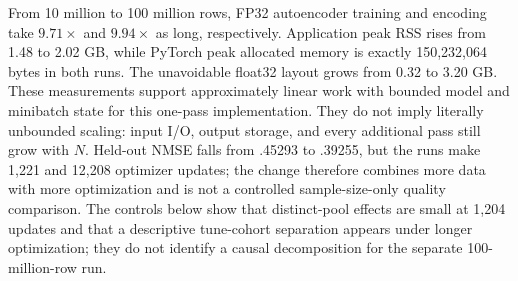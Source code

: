 \documentclass[10pt]{article}
\begin{document}
\begin{table}[H]
\centering
\scriptsize
\setlength{\tabcolsep}{3.0pt}
\caption{Single-run Deep1B GPU scaling measurements; memory values are decimal GB.
``Core'' means autoencoder training or graph \texttt{fit\_transform}.  Autoencoder total
and graph worker time have the broader, method-specific scopes defined in the protocol.
PyTorch allocator memory and incremental NVML process memory are different scopes and
should not be treated as a common total-memory measurement.  The failed DiRe allocation
never became resident.}
\label{tab:deep-scaling}
\end{table}

From 10 million to 100 million rows, FP32 autoencoder training and encoding take
$9.71\times$ and $9.94\times$ as long, respectively.  Application peak RSS rises from
1.48 to 2.02 GB, while PyTorch peak allocated memory is exactly 150,232,064 bytes in
both runs.  The unavoidable float32 layout grows from 0.32 to 3.20 GB.  These
measurements support approximately linear work with bounded model and minibatch state
for this one-pass implementation.  They do not imply literally unbounded scaling:
input I/O, output storage, and every additional pass still grow with $N$.  Held-out NMSE
falls from .45293 to .39255, but the runs make 1,221 and 12,208 optimizer updates;
the change therefore combines more data with more optimization and is not a controlled
sample-size-only quality comparison.  The controls below show that distinct-pool effects
are small at 1,204 updates and that a descriptive tune-cohort separation appears under
longer optimization; they do not identify a causal decomposition for the separate
100-million-row run.
\end{document}
